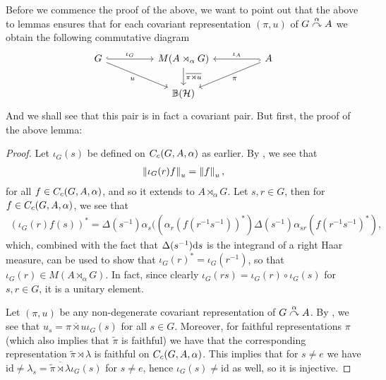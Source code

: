 Before we commence the proof of the above, we want to point out that the above to lemmas ensures that for each covariant representation $(\pi , u)$ of $G \stackrel{\alpha}{\curvearrowright} A$ we obtain the following commutative diagram
\begin{equation}
	\begin{tikzcd}
		G \arrow[rr, "\iota_G", hook] \arrow[rrd, "u"'] && M(A \rtimes_\alpha G) \arrow[d, "\overline{\pi \rtimes u }"] && A \arrow[ll,"\iota_A"',hook] \arrow[lld, "\pi"]\\
		& &\mathbb{B}(\H)&&
	\end{tikzcd}
	\label{diag:iotacom}
\end{equation}
And we shall see that this pair is in fact a covariant pair. But first, the proof of the above lemma:
\begin{proof}
	Let $\iota_G(s)$ be defined on $C_c(G,A,\alpha)$ as earlier. By , we see that
	\begin{align*}
		\left\lVert \iota_G(r) f \right\rVert_u = \left\lVert f \right\rVert_u,
	\end{align*}
	for all $f \in C_c(G,A,\alpha)$, and so it extends to $A \rtimes_\alpha G$. Let $s,r \in G$, then for $f \in C_c(G,A,\alpha)$, we see that
	\begin{align*}
		(\iota_G(r) f(s))^* = \Delta(s^{-1}) \alpha_s ( (\alpha_r(f(r^{-1}s^{-1}))^*) \Delta(s^{-1}) \alpha_{sr}(f(r^{-1}s^{-1})^*),
	\end{align*}
	which, combined with the fact that $\Delta(s^{-1}) \mathrm{d} s$ is the integrand of a right Haar measure, can be used to show that $\iota_G(r)^* = \iota_G(r^{-1})$, so that $\iota_G(r) \in M(A \rtimes_\alpha G)$. In fact, since clearly $\iota_G(rs) = \iota_G(r) \circ \iota_G(s)$ for $s,r \in G$, it is a unitary element.

	Let $(\pi,u)$ be any non-degenerate covariant representation of $G \stackrel{\alpha}{\curvearrowright} A$. By , we see that $u_s  = \overline{ \pi \rtimes u} \iota_G(s)$ for all $ s \in G$. Moreover, for faithful representations $\pi$ (which also implies that $\tilde \pi$ is faithful) we have that the corresponding representation $\tilde \pi \rtimes \lambda$ is faithful on $C_c(G,A,\alpha)$. This implies that for $s \neq e$ we have $\mathrm{id} \neq \lambda_s = \overline{\tilde \pi \rtimes \lambda} \iota_G(s)$ for $s \neq e$, hence $\iota_G(s) \neq \mathrm{id}$ as well, so it is injective.
		

\end{proof}
